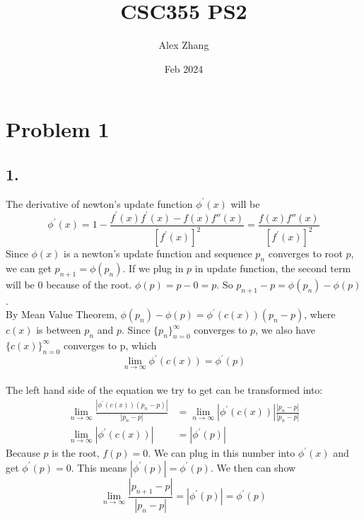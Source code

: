 \documentclass{article}
\title{CSC355 PS2}
\author{Alex Zhang}
\date{Feb 2024}
\begin{document}
\maketitle

\section*{Problem 1}
\subsection*{1.}
The derivative of newton's update function $\phi^\prime(x)$ will be 
$$\phi^\prime(x) = 1 - \frac{f^\prime(x)f^\prime(x) - f(x) f''(x)}{[f^\prime (x)]^2} = \frac{f(x)f''(x)}{[f^\prime (x)]^2}$$ 
Since $\phi(x)$ is a newton's update function and sequence ${p_n}$ converges to root $p$, we can get $p_{n+1} = \phi(p_n)$.
If we plug in $p$ in update function, the second term will be 0 because of the root. $\phi(p) = p - 0 = p$.
So $p_{n+1} - p = \phi(p_n) - \phi(p)$.
\\
By Mean Value Theorem, $\phi(p_n) - \phi(p) = \phi^\prime(c(x))(p_n - p)$, where $c(x)$ is between $p_n$ and $p$.
Since $\{p_n\}^{\infty}_{n=0}$ converges to $p$, we also have $\{c(x)\}^\infty_{n=0}$ converges to p, which 
$$\lim_{n \rightarrow \infty}\phi^\prime(c(x)) = \phi^\prime(p)$$
\\
The left hand side of the equation we try to get can be transformed into:
\begin{align}
  \lim_{n \rightarrow \infty} \frac{| \phi^\prime(c(x))(p_n - p) |}{| p_n - p |} &= \lim_{n \rightarrow \infty} |\phi^\prime(c(x))|\frac{|p_n - p |}{| p_n - p |}  \nonumber \\
  \lim_{n \rightarrow \infty} |\phi^\prime(c(x))| &= |\phi^\prime(p) |\nonumber 
\end{align} 
Because $p$ is the root, $f(p) = 0$. We can plug in this number into $\phi^\prime(x)$ and get $\phi^\prime(p) = 0 $.
This means $|\phi^\prime(p)| = \phi^\prime(p)$. 
We then can show 
$$\lim_{n \rightarrow \infty} \frac{| p_{n +1}- p |}{| p_n - p |} = |\phi^\prime(p)| = \phi^\prime(p)$$
\end{document}
